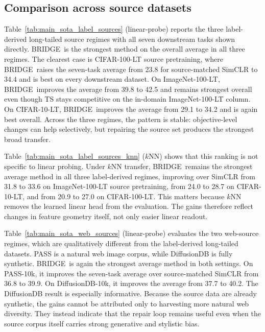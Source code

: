\documentclass{article}
\newcommand{\method}{BRIDGE}
\begin{document}




\subsection{Comparison across source datasets}
Table~\ref{tab:main_sota_label_sources} (linear-probe) reports the three label-derived long-tailed source regimes with all seven downstream tasks shown directly. \method\ is the strongest method on the overall average in all three regimes. The clearest case is CIFAR-100-LT source pretraining, where \method\ raises the seven-task average from 23.8 for source-matched SimCLR to 34.4 and is best on every downstream dataset. On ImageNet-100-LT, \method\ improves the average from 39.8 to 42.5 and remains strongest overall even though TS stays competitive on the in-domain ImageNet-100-LT column. On CIFAR-10-LT, \method\ improves the average from 29.1 to 34.2 and is again best overall. Across the three regimes, the pattern is stable: objective-level changes can help selectively, but repairing the source set produces the strongest broad transfer.



Table~\ref{tab:main_sota_label_sources_knn} ($k$NN) shows that this ranking is not specific to linear probing. Under $k$NN transfer, \method\ remains the strongest average method in all three label-derived regimes, improving over SimCLR from 31.8 to 33.6 on ImageNet-100-LT source pretraining, from 24.0 to 28.7 on CIFAR-10-LT, and from 20.9 to 27.0 on CIFAR-100-LT. This matters because $k$NN removes the learned linear head from the evaluation. The gains therefore reflect changes in feature geometry itself, not only easier linear readout.



Table~\ref{tab:main_sota_web_sources} (linear-probe) evaluates the two web-source regimes, which are qualitatively different from the label-derived long-tailed datasets. PASS is a natural web image corpus, while DiffusionDB is fully synthetic. \method\ is again the strongest average method in both settings. On PASS-10k, it improves the seven-task average over source-matched SimCLR from 36.8 to 39.9. On DiffusionDB-10k, it improves the average from 37.7 to 40.2. The DiffusionDB result is especially informative. Because the source data are already synthetic, the gains cannot be attributed only to harvesting more natural web diversity. They instead indicate that the repair loop remains useful even when the source corpus itself carries strong generative and stylistic bias.
\end{document}
